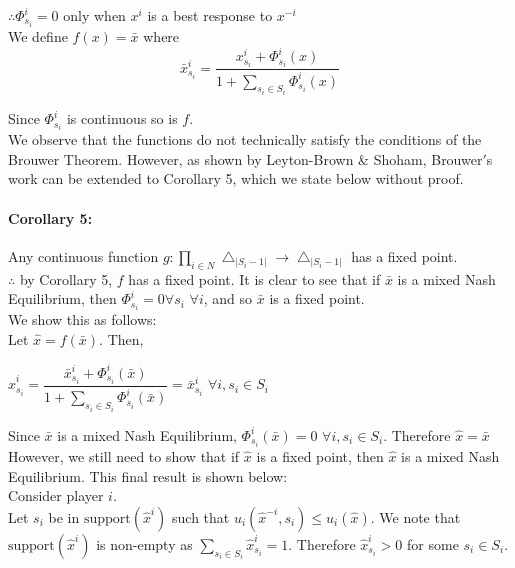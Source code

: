 \documentclass[12pt]{article}
\begin{document}
$\therefore \Phi^i_{s_i} = 0$ only when $x^i$ is a best response to $x^{-i}$\\

We define $f(x) = \bar{x}$ where 
\begin{equation*}
\bar{x}^i_{s_i} = \dfrac{x^i_{s_i} +  \Phi^i_{s_i}(x)}{1 + \sum\limits_{s_i \in S_i}  \Phi^i_{s_i}(x)}
\end{equation*}

Since $ \Phi^i_{s_i}$ is continuous so is $f$.\\

We observe that the functions do not technically satisfy the conditions of the Brouwer Theorem. However, as shown by Leyton-Brown \& Shoham, Brouwer$'$s work can be extended to Corollary 5, which we state below without proof.


\paragraph{Corollary 5:} Any continuous function $g: \prod\limits_{i \in N} \bigtriangleup_{|S_i - 1|} \longrightarrow \bigtriangleup_{|S_i -1|}$ has a fixed point\cite{29}.\\

$\therefore$ by Corollary 5, $f$ has a fixed point. It is clear to see that if $\bar{x}$ is a mixed Nash Equilibrium, then $\Phi^i_{s_i} = 0 \forall s_i$ $ \forall i$, and so $\bar{x}$ is a fixed point.\\

We show this as follows:\\

Let $\hat{x} = f(\bar{x})$. Then,
\begin{center} $\hat{x}^i_{s_i} = \dfrac{\bar{x}^i_{s_i} + \Phi^i_{s_i}(\bar{x})}{1 + \sum\limits_{s_i \in S_i}\Phi^i_{s_i} (\bar{x})} = \bar{x}^i_{s_i}$  $\forall i, s_i \in S_i$
\end{center} 
Since $\bar{x}$ is a mixed Nash Equilibrium, $\Phi_{s_i}^i (\bar{x}) = 0$ $\forall i, s_i \in S_i$. Therefore $\hat{x} = \bar{x}$\\

However, we still need to show that if $\hat{x}$ is a fixed point, then $\hat{x}$ is a mixed Nash Equilibrium. This final result is shown below:\\

Consider player $i$.\\

Let $s_i$ be in $\text{support}(\hat{x}^i)$ such that $u_i(\hat{x}^{-i}, s_i) \leq u_i(\hat{x})$. We note that $\text{support}(\hat{x}^i)$ is non-empty as $\sum\limits_{s_i \in S_i} \hat{x}^i_{s_i} = 1$. Therefore $\hat{x}^i_{s_i} > 0$ for some $s_i \in S_i$.
\end{document}
